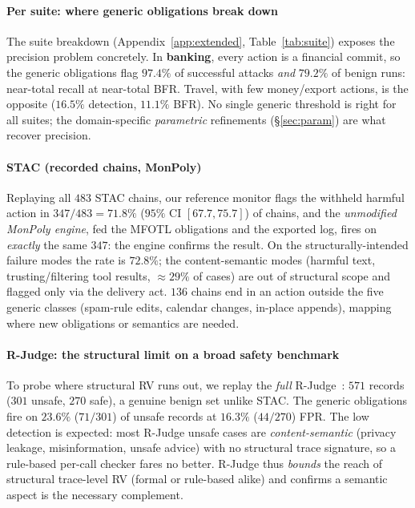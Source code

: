 \documentclass[sigconf]{acmart}
\begin{document}
\paragraph{Per suite: where generic obligations break down} The suite breakdown
(Appendix~\ref{app:extended}, Table~\ref{tab:suite}) exposes the precision problem
concretely. In \textbf{banking}, every action is a financial commit, so the generic
obligations flag $97.4\%$ of successful attacks \emph{and} $79.2\%$ of benign runs: near-total
recall at near-total BFR. Travel, with few money/export actions, is the opposite
($16.5\%$ detection, $11.1\%$ BFR). No single generic threshold is right for all
suites; the domain-specific \emph{parametric} refinements (\S\ref{sec:param}) are what
recover precision.

\paragraph{STAC (recorded chains, MonPoly)} Replaying all
$483$ STAC chains, our reference monitor flags the withheld harmful action in
$347/483 = 71.8\%$ ($95\%$ CI $[67.7,75.7]$) of chains, and the \emph{unmodified
MonPoly engine}, fed the MFOTL obligations and the exported log, fires on
\emph{exactly} the same $347$: the engine confirms the result. On the
structurally-intended failure modes the rate is $72.8\%$; the content-semantic modes
(harmful text, trusting/filtering tool results, $\approx$$29\%$ of cases) are out of
structural scope and flagged only via the delivery act. $136$ chains end in an action
outside the five generic classes (spam-rule edits, calendar changes, in-place
appends), mapping where new obligations or semantics are needed.

\paragraph{R-Judge: the structural limit on a broad safety benchmark} To probe where
structural RV runs out, we replay the \emph{full} R-Judge~\cite{rjudge2024}: $571$
records ($301$ unsafe, $270$ safe), a genuine benign set unlike STAC. The generic
obligations fire on $23.6\%$ ($71/301$) of unsafe records at $16.3\%$ ($44/270$) FPR.
The low detection is expected: most R-Judge unsafe cases are \emph{content-semantic}
(privacy leakage, misinformation, unsafe advice) with no structural trace signature,
so a rule-based per-call checker fares no better. R-Judge thus \emph{bounds} the reach
of structural trace-level RV (formal or rule-based alike) and confirms a semantic
aspect is the necessary complement.
\end{document}
